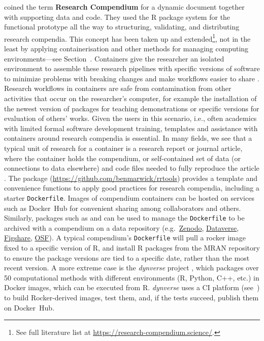 \citet{gentleman_statistical_2007} coined the term \textbf{Research
Compendium} for a dynamic document together with supporting data and
code. They used the R package system \citep{core_writing_1999} for the
functional prototype all the way to structuring, validating, and
distributing research compendia. This concept has been taken up and
extended\footnote{See full literature list at \href{https://research-compendium.science/}{https://research-compendium.science/}.},
not in the least by applying containerisation and other methods for
managing computing environments---see Section~. Containers
give the researcher an isolated environment to assemble these research
pipelines with specific versions of software to minimize problems with
breaking changes and make workflows easier to share
\citep[cf.][]{boettiger_introduction_2015,marwick_packaging_2018}.
Research workflows in containers are safe from contamination from other
activities that occur on the researcher's computer, for example the
installation of the newest version of packages for teaching
demonstrations or specific versions for evaluation of others' works.
Given the users in this scenario, i.e., often academics with limited
formal software development training, templates and assistance with
containers around research compendia is essential. In many fields, we
see that a typical unit of research for a container is a research report
or journal article, where the container holds the compendium, or
self-contained set of data (or connections to data elsewhere) and code
files needed to fully reproduce the article
\citep{marwick_packaging_2018}. The package 
(\url{https://github.com/benmarwick/rrtools}) provides a template and
convenience functions to apply good practices for research compendia,
including a starter \texttt{Dockerfile}. Images of compendium containers
can be hosted on services such as Docker~Hub for convenient sharing
among collaborators and others. Similarly, packages such as
 and  can be used to manage the
\texttt{Dockerfile} to be archived with a compendium on a data
repository (e.g.~\href{https://zenodo.org/}{Zenodo},
\href{https://dataverse.org/}{Dataverse},
\href{https://figshare.com/}{Figshare}, \href{https://osf.io/}{OSF}). A
typical compendium's \texttt{Dockerfile} will pull a rocker image fixed
to a specific version of R, and install R packages from the MRAN
repository to ensure the package versions are tied to a specific date,
rather than the most recent version. A more extreme case is the
\emph{dynverse} project
\citep{saelens_comparisonsinglecelltrajectory_2019}, which packages over
50 computational methods with different environments (R, Python, C++,
etc.) in Docker images, which can be executed from R. \emph{dynverse}
uses a CI platform (see~) to build Rocker-derived images,
test them, and, if the tests succeed, publish them on Docker~Hub.

